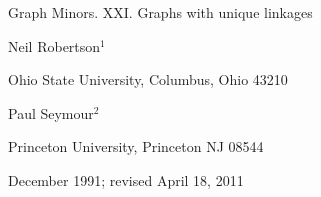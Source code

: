 \origpage{}{}
{\centering
{\Large Graph Minors. XXI. Graphs with unique linkages\par}\bigskip

Neil Robertson$^1$\par
Ohio State University, Columbus, Ohio 43210\par\medskip
Paul Seymour$^2$\par
Princeton University, Princeton NJ 08544\par\medskip
December 1991; revised April 18, 2011%
%
\par
}
\clearpage
